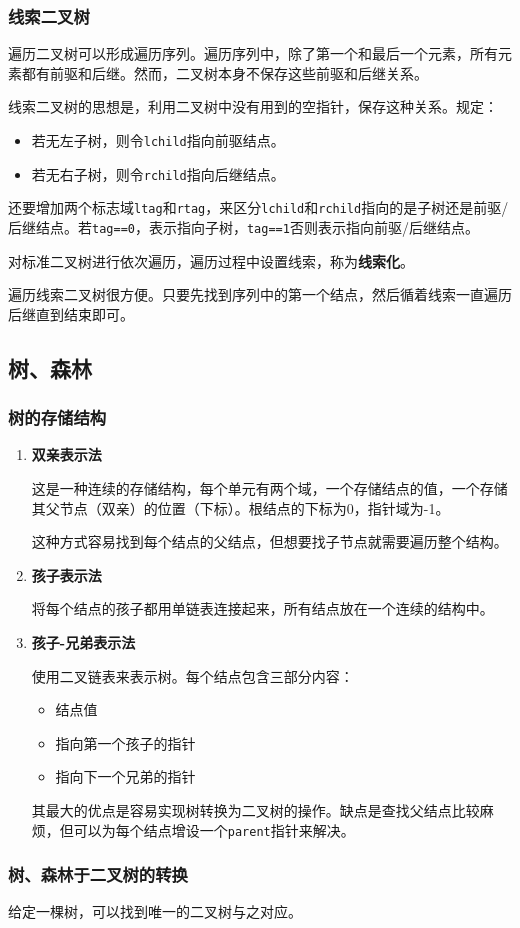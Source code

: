 \documentclass[12pt, a4paper, oneside]{ctexart}
\begin{document}
\subsubsection{线索二叉树}

遍历二叉树可以形成遍历序列。遍历序列中，除了第一个和最后一个元素，所有元素都有前驱和后继。然而，二叉树本身不保存这些前驱和后继关系。

线索二叉树的思想是，利用二叉树中没有用到的空指针，保存这种关系。规定：
\begin{itemize}
  \item 若无左子树，则令\verb|lchild|指向前驱结点。
  \item 若无右子树，则令\verb|rchild|指向后继结点。
\end{itemize}

还要增加两个标志域\verb|ltag|和\verb|rtag|，来区分\verb|lchild|和\verb|rchild|指向的是子树还是前驱/后继结点。若\verb|tag==0|，表示指向子树，\verb|tag==1|否则表示指向前驱/后继结点。

对标准二叉树进行依次遍历，遍历过程中设置线索，称为\textbf{线索化}。

遍历线索二叉树很方便。只要先找到序列中的第一个结点，然后循着线索一直遍历后继直到结束即可。

\subsection{树、森林}

\subsubsection{树的存储结构}

\begin{enumerate}
  \item {\bf 双亲表示法}
  
  这是一种连续的存储结构，每个单元有两个域，一个存储结点的值，一个存储其父节点（双亲）的位置（下标）。根结点的下标为0，指针域为-1。

  这种方式容易找到每个结点的父结点，但想要找子节点就需要遍历整个结构。

  \item {\bf 孩子表示法}
  
  将每个结点的孩子都用单链表连接起来，所有结点放在一个连续的结构中。

  \item {\bf 孩子-兄弟表示法}
  
  使用二叉链表来表示树。每个结点包含三部分内容：
  \begin{itemize}
    \item 结点值
    \item 指向第一个孩子的指针
    \item 指向下一个兄弟的指针
  \end{itemize}

  其最大的优点是容易实现树转换为二叉树的操作。缺点是查找父结点比较麻烦，但可以为每个结点增设一个\verb|parent|指针来解决。
\end{enumerate}

\subsubsection{树、森林于二叉树的转换}

给定一棵树，可以找到唯一的二叉树与之对应。
\end{document}
